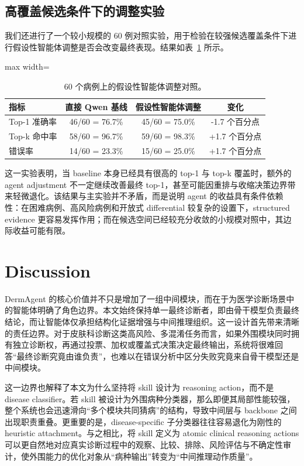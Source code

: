 \documentclass{article}
\begin{document}
\subsection{高覆盖候选条件下的调整实验}

我们还进行了一个较小规模的 60 例对照实验，用于检验在较强候选覆盖条件下进行假设性智能体调整是否会改变最终表现。结果如表~\ref{tab:hyp_adjust} 所示。

\begin{table}[t]
\centering
\caption{60 个病例上的假设性智能体调整对照。}
\label{tab:hyp_adjust}
\begin{adjustbox}{max width=\columnwidth}
\footnotesize
\begin{tabular}{lccc}
\toprule
指标 & 直接 Qwen 基线 & 假设性智能体调整 & 变化 \\
\midrule
Top-1 准确率 & 46/60 = 76.7\% & 45/60 = 75.0\% & -1.7 个百分点 \\
Top-k 命中率 & 58/60 = 96.7\% & 59/60 = 98.3\% & +1.7 个百分点 \\
错误率 & 14/60 = 23.3\% & 15/60 = 25.0\% & +1.7 个百分点 \\
\bottomrule
\end{tabular}
\end{adjustbox}
\end{table}

这一实验表明，当 baseline 本身已经具有很高的 top-1 与 top-k 覆盖时，额外的 agent adjustment 不一定继续改善最终 top-1，甚至可能因重排与收缩决策边界带来轻微退化。该结果与主实验并不矛盾，而是说明 agent 的收益具有条件依赖性：在困难病例、高风险病例和开放式 differential 较复杂的设置下，structured evidence 更容易发挥作用；而在候选空间已经较充分收敛的小规模对照中，其边际收益可能有限。

\section{Discussion}

DermAgent 的核心价值并不只是增加了一组中间模块，而在于为医学诊断场景中的智能体明确了角色边界。本文始终保持单一最终诊断者，即由骨干模型负责最终结论，而让智能体仅承担结构化证据增强与中间推理组织。这一设计首先带来清晰的责任边界。对于皮肤科诊断这类高风险、多混淆任务而言，如果外围模块同时拥有独立诊断权，再通过投票、加权或覆盖式决策决定最终输出，系统将很难回答“最终诊断究竟由谁负责”，也难以在错误分析中区分失败究竟来自骨干模型还是中间模块。

这一边界也解释了本文为什么坚持将 skill 设计为 reasoning action，而不是 disease classifier。若 skill 被设计为外围病种分类器，那么即便其局部性能较强，整个系统也会迅速滑向“多个模块共同猜病”的结构，导致中间层与 backbone 之间出现职责重叠。更重要的是，disease-specific 子分类器往往容易退化为刚性的 heuristic attachment。与之相比，将 skill 定义为 atomic clinical reasoning actions 可以更自然地对应真实诊断过程中的观察、比较、排除、风险评估与不确定性审计，使外围能力的优化对象从“病种输出”转变为“中间推理动作质量”。
\end{document}
